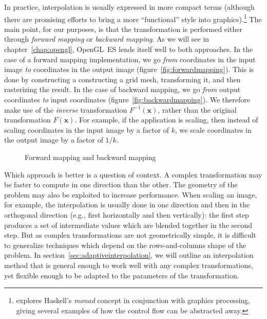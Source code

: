 \documentclass[english,12pt]{ifimaster}
\begin{document}
In practice, interpolation is usually expressed in more compact terms
(although there are promising efforts to bring a more ``functional''
style into graphics).\footnote{\citet{heard08:-beaut-code} explores
  Haskell's \emph{monad} concept in conjunction with graphics
  processing, giving several examples of how the control flow can be
  abstracted away.} The main point, for our purposes, is that the
transformation is performed either through \emph{forward mapping} or
\emph{backward mapping}. As we will see in chapter~\ref{chap:opengl},
OpenGL~ES lends itself well to both approaches. In the case of a
forward mapping implementation, we go \emph{from} coordinates in the
input image \emph{to} coordinates in the output image
(figure~\ref{fig:forwardmapping}). This is done by constructing a
constructing a grid mesh, transforming it, and then rasterizing the
result. In the case of backward mapping, we go \emph{from} output
coordinates \emph{to} input coordinates
(figure~\ref{fig:backwardmapping}). We therefore make use of the
\emph{inverse} transformation $F^{-1}(\mathbf{x})$, rather than the
original transformation $F(\mathbf{x})$. For example, if the
application is scaling, then instead of scaling coordinates in the
input image by a factor of $k$, we scale coordinates in the output
image by a factor of $1/k$.

\begin{figure}
  \centering
  \qquad{}

  \caption{Forward mapping and backward mapping}
  \label{fig:forwardandbackwardmapping}
\end{figure}

Which approach is better is a question of context. A complex
transformation may be faster to compute in one direction than the
other. The geometry of the problem may also be exploited to increase
performance. When scaling an image, for example, the interpolation is
usually done in one direction and then in the orthogonal direction
(e.g., first horizontally and then vertically): the first step
produces a set of intermediate values which are blended together in
the second step. But as complex transformations are not geometrically
simple, it is difficult to generalize techniques which depend on the
rows-and-columns shape of the problem. In
section~\ref{sec:adaptiveinterpolation}, we will outline an
interpolation method that is general enough to work well with any
complex transformations, yet flexible enough to be adapted to the
parameters of the transformation.
\end{document}
